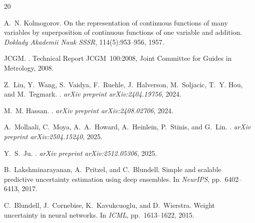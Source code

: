\documentclass{article}
\begin{document}


\begin{thebibliography}{20}

A.~N. Kolmogorov.
\newblock On the representation of continuous functions of many variables by
  superposition of continuous functions of one variable and addition.
\newblock \emph{Doklady Akademii Nauk SSSR}, 114(5):953--956, 1957.

{JCGM}.
.
\newblock Technical Report JCGM~100:2008, Joint Committee for Guides in
  Metrology, 2008.

Z.~Liu, Y.~Wang, S.~Vaidya, F.~Ruehle, J.~Halverson, M.~Soljacic,
  T.~Y. Hou, and M.~Tegmark.
.
\newblock \emph{arXiv preprint arXiv:2404.19756}, 2024.

M.~M. Hassan.
.
\newblock \emph{arXiv preprint arXiv:2408.02706}, 2024.

A.~Mollaali, C.~Moya, A.~A.~Howard, A.~Heinlein, P.~Stinis, and G.~Lin.
.
\newblock \emph{arXiv preprint arXiv:2504.15240}, 2025.

Y.~S.~Ju.
.
\newblock \emph{arXiv preprint arXiv:2512.05306}, 2025.

B.~Lakshminarayanan, A.~Pritzel, and C.~Blundell.
\newblock Simple and scalable predictive uncertainty estimation using deep
  ensembles.
\newblock In \emph{NeurIPS}, pp.\ 6402--6413, 2017.

C.~Blundell, J.~Cornebise, K.~Kavukcuoglu, and D.~Wierstra.
\newblock Weight uncertainty in neural networks.
\newblock In \emph{ICML}, pp.\ 1613--1622, 2015.


\end{thebibliography}
\end{document}
